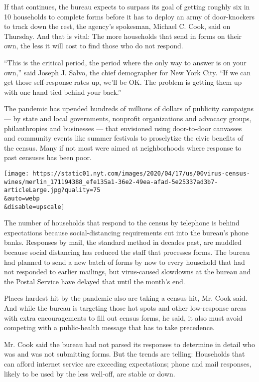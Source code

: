 If that continues, the bureau expects to surpass its goal of getting
roughly six in 10 households to complete forms before it has to deploy
an army of door-knockers to track down the rest, the agency's spokesman,
Michael C. Cook, said on Thursday. And that is vital: The more
households that send in forms on their own, the less it will cost to
find those who do not respond.

``This is the critical period, the period where the only way to answer
is on your own,'' said Joseph J. Salvo, the chief demographer for New
York City. ``If we can get those self-response rates up, we'll be OK.
The problem is getting them up with one hand tied behind your back.''

The pandemic has upended hundreds of millions of dollars of publicity
campaigns --- by state and local governments, nonprofit organizations
and advocacy groups, philanthropies and businesses --- that envisioned
using door-to-door canvasses and community events like summer festivals
to proselytize the civic benefits of the census. Many if not most were
aimed at neighborhoods where response to past censuses has been poor.

\texttt{[image: https://static01.nyt.com/images/2020/04/17/us/00virus-census-wines/merlin\_171194388\_efe135a1-36e2-49ea-afad-5e25337ad3b7-articleLarge.jpg?quality=75\\\&auto=webp\\\&disable=upscale]}

The number of households that respond to the census by telephone is
behind expectations because social-distancing requirements cut into the
bureau's phone banks. Responses by mail, the standard method in decades
past, are muddled because social distancing has reduced the staff that
processes forms. The bureau had planned to send a new batch of forms by
now to every household that had not responded to earlier mailings, but
virus-caused slowdowns at the bureau and the Postal Service have delayed
that until the month's end.

Places hardest hit by the pandemic also are taking a census hit, Mr.
Cook said. And while the bureau is targeting those hot spots and other
low-response areas with extra encouragements to fill out census forms,
he said, it also must avoid competing with a public-health message that
has to take precedence.

Mr. Cook said the bureau had not parsed its responses to determine in
detail who was and was not submitting forms. But the trends are telling:
Households that can afford internet service are exceeding expectations;
phone and mail responses, likely to be used by the less well-off, are
stable or down.

